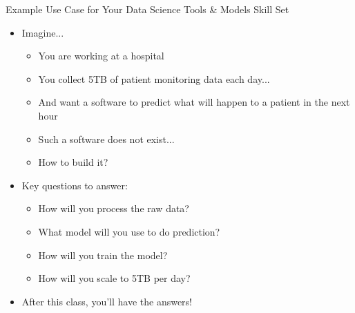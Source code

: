 \documentclass[aspectratio=169]{beamer}
\begin{document}
\begin{frame}{Example Use Case for Your  Data Science Tools \& Models Skill Set}
    \begin{itemize}
\item Imagine...
	\begin{itemize}
	\item You are working at a hospital
	\item You collect 5TB of patient monitoring data each day...
	\item And want a software to predict what will happen to a patient in the next hour
	\item Such a software does not exist...
	\item How to build it?
	\end{itemize}
\item Key questions to answer:
	\begin{itemize}
	\item How will you process the raw data?
	\item What model will you use to do prediction?
	\item How will you train the model?
	\item How will you scale to 5TB per day?
	\end{itemize}
\item After this class, you'll have the answers!    \end{itemize}
\end{frame}

\end{document}
